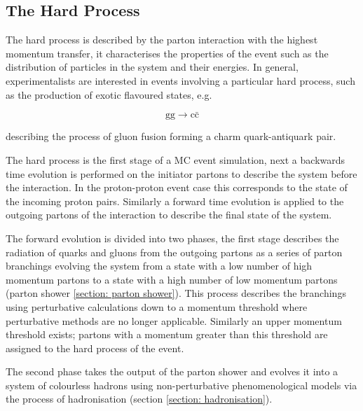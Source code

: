 \subsection{The Hard Process}

The hard process is described by the parton interaction with the highest momentum transfer, it characterises the properties of the event such as the distribution of particles in the system and their energies. In general, experimentalists are interested in events involving a particular hard process, such as the production of exotic flavoured states, e.g.

\begin{equation}
	\mathrm{gg} \rightarrow \mathrm{c\bar{c}}
\end{equation}

describing the process of gluon fusion forming a charm quark-antiquark pair.

The hard process is the first stage of a MC event simulation, next a backwards time evolution is performed on the initiator partons to describe the system before the interaction. In the proton-proton event case this corresponds to the state of the incoming proton pairs. Similarly a forward time evolution is applied to the outgoing partons of the interaction to describe the final state of the system.

The forward evolution is divided into two phases, the first stage describes the radiation of quarks and gluons from the outgoing partons as a series of parton branchings evolving the system from a state with a low number of high momentum partons to a state with a high number of low momentum partons (parton shower \ref{section: parton shower}). This process describes the branchings using perturbative calculations down to a momentum threshold where perturbative methods are no longer applicable. Similarly an upper momentum threshold exists; partons with a momentum greater than this threshold are assigned to the hard process of the event.

The second phase takes the output of the parton shower and evolves it into a system of colourless hadrons using non-perturbative phenomenological models via the process of hadronisation (section \ref{section: hadronisation}). 

%
%
